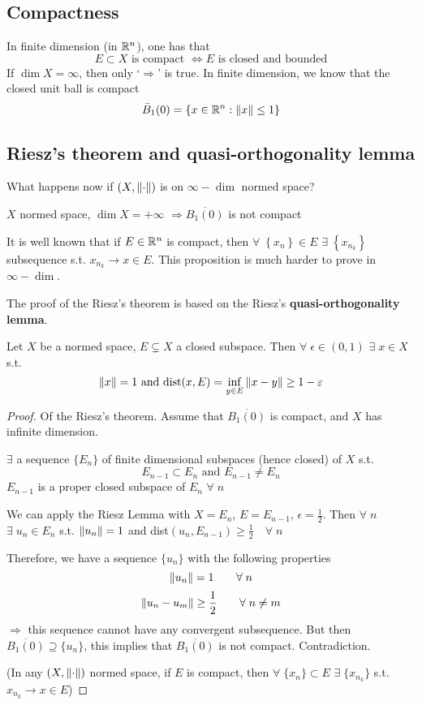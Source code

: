 \subsection{Compactness}
In finite dimension (in \(\mathbb{R}^n\)), one has that
\[
    E \subset X \mbox{ is compact } \Leftrightarrow E \mbox{ is closed and bounded}
\]
If \(\dim X = \infty\), then only `\(\Rightarrow\)' is true. In finite dimension, we know that the closed unit ball is compact
\[
    \bar{B}_1(0) = \left\{ x \in \mathbb{R}^n : \norm{x} \leq 1\right\}
\]
\subsection{Riesz's theorem and quasi-orthogonality lemma}
What happens now if \((X, \norm{\cdot})\) is on \(\infty-\dim\) normed space?
\begin{theorem}
    \(X\) normed space, \(\dim X = +\infty\) \(\Rightarrow \overline{B_1(0)}\) is not compact
\end{theorem}
\begin{remark}
    It is well known that if \(E \in \mathbb{R}^n\) is compact, then \(\forall \; \left\{ x_n \right\} \in E \) \(\exists \; \left\{ x_{n_k} \right\}\) subsequence s.t. \(x_{n_k} \to x \in E\).  
    This proposition is much harder to prove in \(\infty-\dim\).
\end{remark}
The proof of the Riesz's theorem is based on the Riesz's \textbf{quasi-orthogonality lemma}.
\begin{lemma}
    Let \(X\) be a normed space, \(E \subsetneq X\) a closed subspace. 
    Then \(\forall \; \epsilon \in (0,1)\) \(\exists \; x \in X\) s.t.
    \[
        \norm{x}=1 \text{ and dist}(x, E) = \inf_{y \in E} \norm{x-y} \geq 1- \varepsilon
    \]
\end{lemma}
\begin{proof}
    Of the Riesz's theorem. Assume that \(\overline{B_1(0)}\) is compact, and \(X \) has infinite dimension. 

    \(\exists\) a sequence \(\{E_n\}\) of finite dimensional subspaces (hence closed) of \(X\) s.t. 
    \[
        E_{n-1} \subset E_n \text{ and } E_{n-1} \neq E_n
    \]
    \(E_{n-1}\) is a proper closed subspace of \(E_n\) \(\forall\; n\)

    We can apply the Riesz Lemma with \(X = E_n\), \(E=E_{n-1}\), \(\epsilon=\frac{1}{2}\). 
    Then \(\forall \; n\) \(\exists \; u_n \in E_n  \) s.t. \(\norm{u_n}=1\) and dist\((u_n, E_{n-1}) \geq \frac{1}{2} \quad \forall\; n\)
    
    Therefore, we have a sequence \(\{u_n\}\) with the following properties 
    \[
        \norm{u_n}=1 \qquad \forall\; n
    \]
    \[
        \norm{u_n-u_m} \geq \frac{1}{2} \qquad \forall\; n \neq m
    \]
    \(\Rightarrow\) this sequence cannot have any convergent subsequence. 
    But then \(\overline{B_1(0)} \supseteq \{u_n\}\), this implies that \(\overline{B_1(0)}\) is not compact.
    Contradiction.

    (In any \(\left(X, \norm{\cdot}\right)\) normed space, if \(E\) is compact, 
    then \(\forall\; \{x_n\} \subset E \) \(\exists \; \{x_{n_k}\}\) s.t. \(x_{n_k} \rightarrow x \in E\))
\end{proof}

